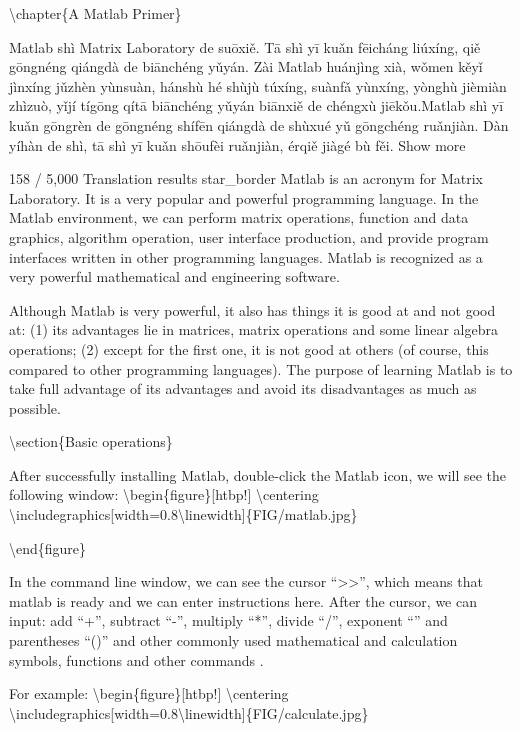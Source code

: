 \documentclass[10pt,math=newtx,citestyle=gb7714-2015,bibstyle=gb7714-2015]{elegantbook}
\begin{document}
	
	
	\textbackslash{}chapter\{A Matlab Primer\}
	
	
	Matlab shì Matrix Laboratory de suōxiě. Tā shì yī kuǎn fēicháng liúxíng, qiě gōngnéng qiángdà de biānchéng yǔyán. Zài Matlab huánjìng xià, wǒmen kěyǐ jìnxíng jǔzhèn yùnsuàn, hánshù hé shùjù túxíng, suànfǎ yùnxíng, yònghù jièmiàn zhìzuò, yǐjí tígōng qítā biānchéng yǔyán biānxiě de chéngxù jiēkǒu.Matlab shì yī kuǎn gōngrèn de gōngnéng shífēn qiángdà de shùxué yǔ gōngchéng ruǎnjiàn. Dàn yíhàn de shì, tā shì yī kuǎn shōufèi ruǎnjiàn, érqiě jiàgé bù fěi.
	Show more
	
	
	158 / 5,000
	Translation results
	star\_border
	Matlab is an acronym for Matrix Laboratory. It is a very popular and powerful programming language. In the Matlab environment, we can perform matrix operations, function and data graphics, algorithm operation, user interface production, and provide program interfaces written in other programming languages. Matlab is recognized as a very powerful mathematical and engineering software.
	
	Although Matlab is very powerful, it also has things it is good at and not good at: (1) its advantages lie in matrices, matrix operations and some linear algebra operations; (2) except for the first one, it is not good at others (of course, this compared to other programming languages). The purpose of learning Matlab is to take full advantage of its advantages and avoid its disadvantages as much as possible.
	
	\textbackslash{}section\{Basic operations\}
	
	After successfully installing Matlab, double-click the Matlab icon, we will see the following window:
	\textbackslash{}begin\{figure\}[htbp!]
	\textbackslash{}centering
	\textbackslash{}includegraphics[width=0.8\textbackslash{}linewidth]\{FIG/matlab.jpg\}
	
	\textbackslash{}end\{figure\}
	
	In the command line window, we can see the cursor ``>>'', which means that matlab is ready and we can enter instructions here. After the cursor, we can input: add ``+'', subtract ``-'', multiply ``*'', divide ``/'', exponent ``'' and parentheses ``()'' and other commonly used mathematical and calculation symbols, functions and other commands .
	
	For example:
	\textbackslash{}begin\{figure\}[htbp!]
	\textbackslash{}centering
	\textbackslash{}includegraphics[width=0.8\textbackslash{}linewidth]\{FIG/calculate.jpg\}
	
\end{document}
